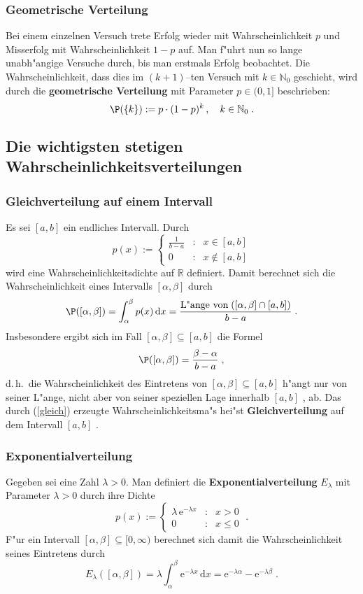 \documentclass[ngerman,draft,parskip=half,twoside]{scrartcl}
\newcommand*{\R}{\mathbb{R}}      %
\newcommand*{\N}{\mathbb{N}}      %
\begin{document}
\subsubsection{Geometrische Verteilung}
Bei einem einzelnen Versuch trete Erfolg wieder mit Wahrscheinlichkeit $p$ und Misserfolg
mit Wahrscheinlichkeit $1-p$ auf. Man f"uhrt nun so lange unabh"angige Versuche durch, bis
man erstmals Erfolg beobachtet. Die Wahrscheinlichkeit, dass dies im $(k+1)$--ten Versuch mit
$k\in\N_0$ geschieht, wird durch die \textbf{geometrische Verteilung} mit Parameter $p\in(0,1]$
beschrieben$\colon$
$$
\P(\{k\}):= p\cdot(1-p)^k\,,\quad k\in\N_0\;.
$$
\subsection{Die wichtigsten stetigen Wahrscheinlichkeitsverteilungen}

\subsubsection{Gleichverteilung auf einem Intervall}
Es sei $[a,b]$ ein endliches Intervall. Durch
$$
p(x):=\left\{
\begin{array}{ccl}
\frac{1}{b-a} &:& x\in [a,b]\\
 0 &:& x\notin [a,b]
\end{array}
\right.
$$
wird eine Wahrscheinlichkeitsdichte auf $\R$ definiert. Damit berechnet sich die Wahrscheinlichkeit
eines Intervalls $[\alpha,\beta]$ durch
\begin{equation}
\label{gleich}
\P([\alpha,\beta])=\int_\alpha^\beta p(x)\,\mathrm dx= \frac{\mbox{L"ange von}\;([\alpha,\beta]\cap[a,b])}
{b-a}\;.
\end{equation}
Insbesondere ergibt sich im Fall $[\alpha,\beta]\subseteq [a,b]$ die Formel
$$
\P([\alpha,\beta])= \frac{\beta-\alpha}{b-a}\;,
$$
d.\,h.~die Wahrscheinlichkeit des Eintretens von $[\alpha,\beta]\subseteq[a,b]$
 h"angt nur von seiner L"ange, nicht aber von
seiner speziellen Lage innerhalb $[a,b]$ , ab.
Das durch (\ref{gleich}) erzeugte Wahrscheinlichkeitsma"s hei"st \textbf{Gleichverteilung} auf dem
Intervall $[a,b]$ .
\subsubsection{Exponentialverteilung}
Gegeben sei eine Zahl $\lambda>0$. Man definiert die
\textbf{Exponentialverteilung} $E_\lambda$ mit Parameter $\lambda>0$ durch
ihre Dichte
$$
p(x):=\left\{
\begin{array}{ccr}
\lambda\,\mathrm e^{-\lambda x} &:& x>0\\
0 &:& x\le 0
\end{array}
\right.\;.
$$
F"ur ein Intervall $[\alpha,\beta]\subseteq [0,\infty)$ berechnet sich damit
die Wahrscheinlichkeit seines Eintretens durch
$$
E_\lambda([\alpha,\beta])=\lambda \int_\alpha^\beta \mathrm e^{-\lambda x}\,\mathrm dx
= \mathrm e^{-\lambda\alpha}- \mathrm e^{-\lambda\beta}\;.
$$
\end{document}
